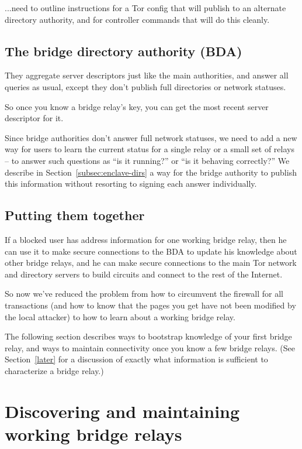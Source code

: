 \documentclass{llncs}
\begin{document}
...need to outline instructions for a Tor config that will publish
to an alternate directory authority, and for controller commands
that will do this cleanly.

\subsection{The bridge directory authority (BDA)}

They aggregate server descriptors just like the main authorities, and
answer all queries as usual, except they don't publish full directories
or network statuses.

So once you know a bridge relay's key, you can get the most recent
server descriptor for it.

Since bridge authorities don't answer full network statuses, we
need to add a new way for users to learn the current status for a
single relay or a small set of relays -- to answer such questions as
``is it running?''  or ``is it behaving correctly?'' We describe in
Section~\ref{subsec:enclave-dirs} a way for the bridge authority to
publish this information without resorting to signing each answer
individually.

\subsection{Putting them together}

If a blocked user has address information for one working bridge relay,
then he can use it to make secure connections to the BDA to update his
knowledge about other bridge
relays, and he can make secure connections to the main Tor network
and directory servers to build circuits and connect to the rest of
the Internet.

So now we've reduced the problem from how to circumvent the firewall
for all transactions (and how to know that the pages you get have not
been modified by the local attacker) to how to learn about a working
bridge relay.

The following section describes ways to bootstrap knowledge of your first
bridge relay, and ways to maintain connectivity once you know a few
bridge relays. (See Section~\ref{later} for a discussion of exactly
what information is sufficient to characterize a bridge relay.)

\section{Discovering and maintaining working bridge relays}
\end{document}
